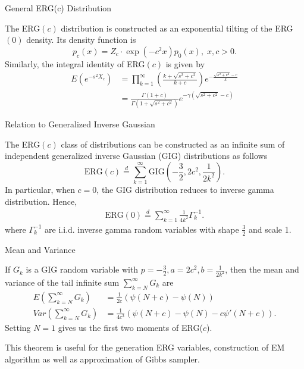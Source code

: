\documentclass[10pt]{beamer}
\theoremstyle{remark}
\theoremstyle{definition}
\begin{document}
\begin{frame}{General ERG(c) Distribution}
	\begin{definition}
		\label{def:PG_dc}
		The ERG$(c)$ distribution is constructed as an exponential tilting of the ERG$(0)$ density. Its density function is
		\begin{equation*}
		p_c\left(x\right) = Z_c \cdot \exp\left(- c^2 x\right) p_0(x),\;  x, c >0.
		\end{equation*}
		Similarly, the integral identity of ERG$(c)$ is given by
		\begin{align*}
		E\left(e^{-s^2 X_c}\right) &= \prod_{k=1}^\infty \left( \frac{k + \sqrt{s^2 + c^2}}{k + c} \right) e^{-\frac{\sqrt{s^2 + c^2}-c}{k}}\\
		&= \frac{\Gamma(1+c)}{\Gamma(1+\sqrt{s^2+c^2})} e^{-\gamma(\sqrt{s^2+c^2}-c)}
		\end{align*}
	\end{definition}
\end{frame}

\begin{frame}{Relation to Generalized Inverse Gaussian}
\begin{theorem}
	\label{thm:theorem_1}
	The ERG$(c)$ class of distributions can be constructed as an infinite sum of independent generalized inverse Gaussian (GIG) distributions as follows
	$$
	\text{ERG}(c) \overset{d}{=} \sum_{k=1}^\infty \text{GIG}\left(-\frac{3}{2}, 2c^2, \frac{1}{2k^2}\right).
	$$ 
	In particular, when $c=0$, the GIG distribution reduces to inverse gamma distribution. Hence,
	\begin{align*}
	\text{ERG}(0) \overset{d}{=} \sum_{k=1}^\infty \frac{1}{4k^2} \Gamma^{-1}_k.
	\end{align*}
	where $\Gamma^{-1}_k$ are i.i.d. inverse gamma random variables with shape $\frac{3}{2}$ and scale 1. 
\end{theorem}
\end{frame}

\begin{frame}{Mean and Variance}
\begin{theorem}
	\label{thm:moments}
	If $G_k$ is a GIG random variable with $p = -\frac{3}{2}, a=2c^2, b=\frac{1}{2k^2}$, then the mean and variance of the tail infinite sum $\sum_{k=N}^\infty G_k$ are
	\begin{align*}
	E\left(\sum_{k=N}^\infty G_k\right) &= \frac{1}{2c}\left(\psi(N+c) - \psi(N)\right) \\
	Var\left(\sum_{k=N}^\infty G_k\right) &= \frac{1}{4c^3} \left(\psi(N+c) - \psi(N) - c \psi'(N+c)\right).
	\end{align*}
	Setting $N=1$ gives us the first two moments of ERG($c$).
\end{theorem}
\footnotesize
This theorem is useful for the generation ERG variables, construction of EM algorithm as well as approximation of Gibbs sampler.
\end{frame}
\end{document}
